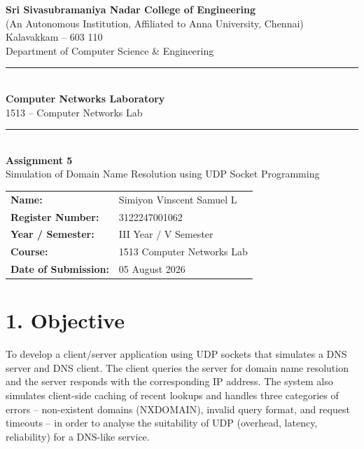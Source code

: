 \documentclass[11pt]{article}
\title{\vspace{-2cm}}
\date{}
\begin{document}
\begin{titlepage}
\centering
\vspace*{1cm}
{\large \textbf{Sri Sivasubramaniya Nadar College of Engineering}}\\
{\small (An Autonomous Institution, Affiliated to Anna University, Chennai)}\\
{\small Kalavakkam -- 603 110}\\[0.3cm]
{\small Department of Computer Science \& Engineering}\\[1.5cm]

\rule{\linewidth}{0.5mm}\\[0.4cm]
{\LARGE \textbf{Computer Networks Laboratory}}\\[0.3cm]
{\Large 1513 -- Computer Networks Lab}\\[0.4cm]
\rule{\linewidth}{0.5mm}\\[1.5cm]

{\huge \textbf{Assignment 5}}\\[0.4cm]
{\Large Simulation of Domain Name Resolution using UDP Socket Programming}\\[2cm]

\begin{center}
\begin{tabular}{ll}
\textbf{Name:} & Simiyon Vinscent Samuel L \\[0.2cm]
\textbf{Register Number:} & 3122247001062 \\[0.2cm]
\textbf{Year / Semester:} & III Year / V Semester \\[0.2cm]
\textbf{Course:} & 1513 Computer Networks Lab \\[0.2cm]
\textbf{Date of Submission:} & 05 August 2026 \\[0.2cm]
\end{tabular}
\end{center}

\vfill
\end{titlepage}

\section*{1. Objective}
To develop a client/server application using UDP sockets that simulates a DNS server and DNS
client. The client queries the server for domain name resolution and the server responds with
the corresponding IP address. The system also simulates client-side caching of recent lookups
and handles three categories of errors -- non-existent domains (NXDOMAIN), invalid query
format, and request timeouts -- in order to analyse the suitability of UDP (overhead, latency,
reliability) for a DNS-like service.
\end{document}
